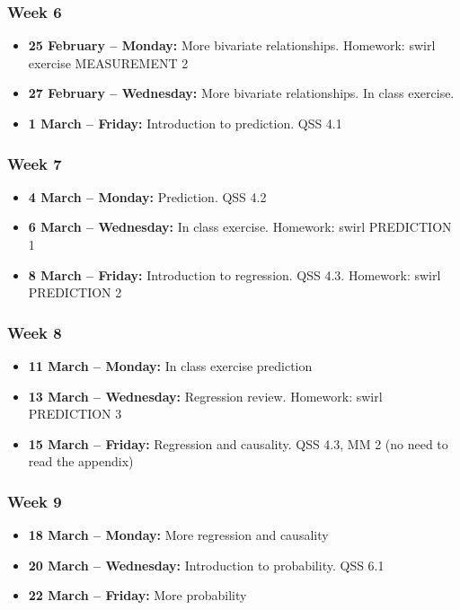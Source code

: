 \documentclass[a4paper,12pt]{article}
\begin{document}
\subsubsection*{Week 6}

\begin{itemize}
	\item \textbf{25 February -- Monday:} More bivariate relationships. Homework: swirl exercise MEASUREMENT 2
	\item \textbf{27 February -- Wednesday:} More bivariate relationships. In class exercise.
	\item \textbf{1 March -- Friday:}  Introduction to prediction. QSS 4.1 
\end{itemize}

\subsubsection*{Week 7}

\begin{itemize}
	\item \textbf{4 March -- Monday:} Prediction. QSS 4.2
	\item \textbf{6 March -- Wednesday:} In class exercise. Homework: swirl PREDICTION 1
	\item \textbf{8 March -- Friday:} Introduction to regression. QSS 4.3. Homework: swirl PREDICTION 2 
\end{itemize}

\subsubsection*{Week 8}

\begin{itemize}
	\item \textbf{11 March -- Monday:} In class exercise prediction
	\item \textbf{13 March -- Wednesday:} Regression review. Homework: swirl PREDICTION 3
	\item \textbf{15 March -- Friday:} Regression and causality. QSS 4.3, MM 2 (no need to read the appendix) 
\end{itemize}

\subsubsection*{Week 9}

\begin{itemize}
	\item \textbf{18 March -- Monday:} More regression and causality 
	\item \textbf{20 March -- Wednesday:} Introduction to probability. QSS 6.1
	\item \textbf{22 March -- Friday:} More probability 
\end{itemize}
\end{document}
